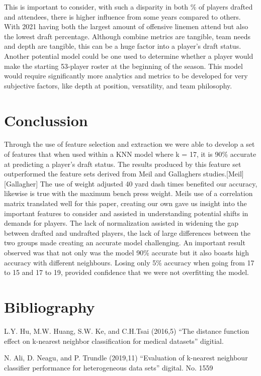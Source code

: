 \documentclass[confrence]{IEEEtran}
\begin{document}
This is important to consider, with such a disparity in both \% of players drafted and attendees, there is higher influence from some years compared to others.
With 2021 having both the largest amount of offensive linemen attend but also the lowest draft percentage.
Although combine metrics are tangible, team needs and depth are tangible, this can be a huge factor into a player's draft status.
Another potential model could be one used to determine whether a player would make the starting 53-player roster at the beginning of the season.
This model would require significantly more analytics and metrics to be developed for very subjective factors, like depth at position, versatility, and team philosophy.
\section*{Conclussion}
Through the use of feature selection and extraction we were able to develop a set of features that when used within a KNN model where k = 17, it is 90\% accurate at predicting a player's draft status.
The results produced by this feature set outperformed the feature sets derived from Meil and Gallaghers studies.[Meil][Gallagher]
The use of weight adjusted 40 yard dash times benefited our accuracy, likewise is true with the maximum bench press weight. 
Meils use of a correlation matrix translated well for this paper, creating our own gave us insight into the important features to consider and assisted in understanding potential shifts in demands for players.
The lack of normalization assisted in widening the gap between drafted and undrafted players, the lack of large differences between the two groups made creating an accurate model challenging.
An important result observed was that not only was the model 90\% accurate but it also boasts high accuracy with different neighbours.
Losing only 5\% accuracy when going from 17 to 15 and 17 to 19, provided confidence that we were not overfitting the model.

\section*{Bibliography}
L.Y. Hu, M.W. Huang, S.W. Ke, and C.H.Tsai (2016,5) “The distance function effect on k-nearest neighbor classification for medical datasets” digitial.

N. Ali, D. Neagu, and P. Trundle (2019,11) “Evaluation of k-nearest neighbour classifier performance for heterogeneous data sets” digital. No. 1559 
\end{document}
